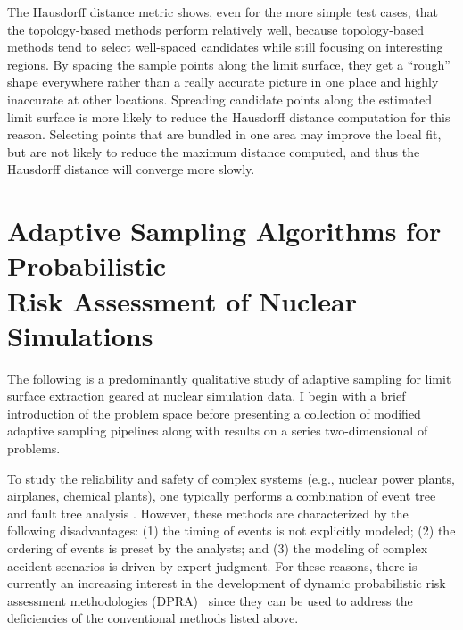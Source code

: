 The Hausdorff distance metric shows, even for the more simple test cases, that the topology-based methods perform relatively well, because topology-based methods tend to select well-spaced candidates while still focusing on interesting regions.
%
By spacing the sample points along the limit surface, they get a ``rough'' shape everywhere rather than a really accurate picture in one place and highly inaccurate at other locations.
%
Spreading candidate points along the estimated limit surface is more likely to reduce the Hausdorff distance computation for this reason.
%
Selecting points that are bundled in one area may improve the local fit, but are not likely to reduce the maximum distance computed, and thus the Hausdorff distance will converge more slowly.



\section{Adaptive Sampling Algorithms for Probabilistic\\Risk Assessment of Nuclear Simulations}
\label{paper:psa}

The following is a predominantly qualitative study of adaptive sampling for limit surface extraction geared at nuclear simulation data.
%
I begin with a brief introduction of the problem space before presenting a collection of modified adaptive sampling pipelines along with results on a series two-dimensional of problems.

To study the reliability and safety of complex systems (e.g., nuclear power plants, airplanes, chemical plants), one typically performs a combination of event tree and fault tree analysis \cite{Zio2009}.
%
However, these methods are characterized by the following disadvantages: (1) the timing of events is not explicitly modeled; (2) the ordering of events is preset by the analysts; and (3) the modeling of complex accident scenarios is driven by expert judgment.
%
For these reasons, there is currently an increasing interest in the development of dynamic probabilistic risk assessment methodologies (DPRA)~\cite{Siu1994} since they can be used to address the deficiencies of the conventional methods listed above.

